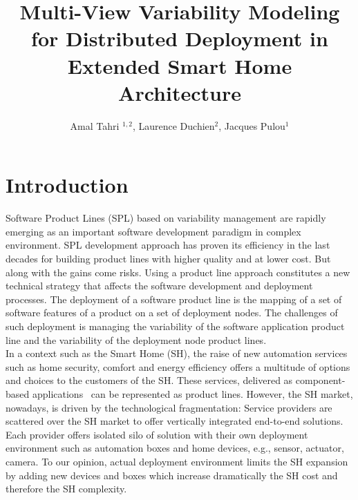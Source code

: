 \documentclass{llncs}
\begin{document}
\title{Multi-View Variability Modeling for Distributed Deployment in Extended Smart Home Architecture}

\author{Amal Tahri $ ^{1,2}$, Laurence Duchien$ ^{2}$, Jacques Pulou$ ^{1}$}

\maketitle

\begin{abstract}

\end{abstract}


\section{Introduction}\label{sec:Introduction}	
Software Product Lines (SPL) based on variability management are rapidly emerging as an important software development paradigm in complex environment. SPL development approach has proven its efficiency in the last decades for building product lines with higher quality and at lower cost. But along with the gains come risks. Using a product line approach constitutes a new technical strategy that affects the software development and deployment processes. The deployment of a software product line is the mapping of a set of software features of a product on a set of deployment nodes. The challenges of such deployment is managing the variability of the software application product line and the variability of the deployment node product lines.\\ In a context such as the Smart Home (SH), the raise of new automation services such as home security, comfort and energy efficiency offers a multitude of options and choices to the customers of the SH. These services, delivered as component-based applications~\cite{Szyperski} can be represented as product lines. However, the SH market, nowadays, is driven by the technological fragmentation: Service providers are scattered over the SH market to offer vertically integrated end-to-end solutions. Each provider offers isolated silo of solution with their own deployment environment such as automation boxes and home devices, e.g., sensor, actuator, camera. To our opinion, actual deployment environment limits the SH expansion by adding new devices and boxes which increase dramatically the SH cost and therefore the SH complexity.\\
\end{document}
